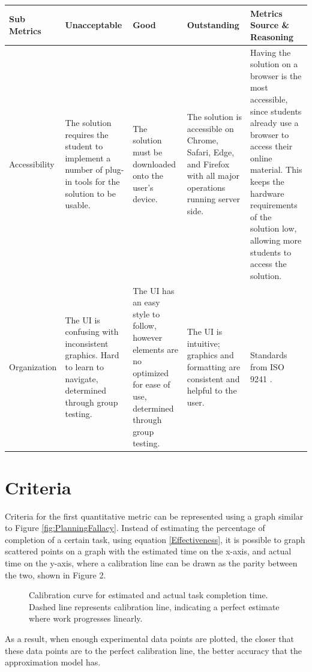 \documentclass[11pt]{article}
\begin{document}
\begin{table}[!htbp]
\centering
\begin{tabular}{|m{2cm}|m{4cm}|m{4cm}|m{4cm}|m{3cm}|}
\hline
Sub Metrics &
  Unacceptable &
  Good &
  Outstanding &
  Metrics Source \& Reasoning \\ \hline
Accessibility &
  The solution requires the student to implement a number of plug-in tools for the solution to be usable. &
  The solution must be downloaded onto the user's device. &
  The solution is accessible on Chrome, Safari, Edge, and Firefox with all major operations running server side. &
  Having the solution on a browser is the most accessible, since students already use a browser to access their online material. This keeps the hardware requirements of the solution low, allowing more students to access the solution.\\ \hline
Organization &
  The UI is confusing with inconsistent graphics. Hard to learn to navigate, determined through group testing. &
  The UI has an easy style to follow, however elements are no optimized for ease of use, determined through group testing. &
  The UI is intuitive; graphics and formatting are consistent and helpful to the user. &
  Standards from ISO 9241 \cite{ISO}.
   \\ \hline
\end{tabular}
\end{table}


\section{Criteria}
    Criteria for the first quantitative metric can be represented using a graph similar to Figure \ref{fig:PlanningFallacy}. Instead of estimating the percentage of completion of a certain task, using equation \ref{Effectiveness}, it is possible to graph scattered points on a graph with the estimated time on the x-axis, and actual time on the y-axis, where a calibration line can be drawn as the parity between the two, shown in Figure 2. 
    
    \begin{figure}[H] 
        \caption{Calibration curve for estimated and actual task completion time. Dashed line represents calibration line, indicating a perfect estimate where work progresses linearly.}
        \label{fig:Utility Graph for Objective 1}
    \end{figure}
    As a result, when enough experimental data points are plotted, the closer that these data points are to the perfect calibration line, the better accuracy that the approximation model has. 
    
\end{document}
